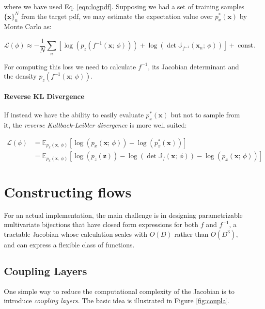 where we have used Eq. \ref{eqn:logpdf}. Supposing we had a set of training samples $\{\mathbf{x}\}^N_n$ from the target pdf, we may estimate the expectation value over $p_x^*(\mathbf{x})$ by Monte Carlo as:

\[
\mathcal{L}(\phi) \approx -\frac{1}{N} \sum_n [\log(p_z(f^{-1}(\mathbf{x}; \, \phi)))+\log\left(\det\mathbb{J}_{f^{-1}}(\mathbf{x}_n; \, \phi)\right)] +\; \text{const.}
\]

For computing this loss we need to calculate $f^{-1}$, its Jacobian determinant and the density $p_z(f^{-1}(\mathbf{x}; \, \phi))$. 

\paragraph{Reverse KL Divergence} If instead we have the ability to easily evaluate $p_x^*(\mathbf{x})$ but not to sample from it, the \emph{reverse Kullback-Leibler divergence} is more well suited:

\[
\begin{aligned}
    \mathcal{L}(\phi) &= \mathbb{E}_{p_x(\mathbf{x}, \, \phi)}[\log(p_x(\mathbf{x}; \, \phi)) - \log(p_x^*(\mathbf{x}))]\\
    &= \mathbb{E}_{p_x(\mathbf{x}, \, \phi)}[\log(p_z(\mathbf{z}))-\log\left(\det\mathbb{J}_{f}(\mathbf{x}; \, \phi)\right)-\log(p_x(\mathbf{x}; \, \phi))]
\end{aligned}
\]

\section{Constructing flows}
For an actual implementation, the main challenge is in designing parametrizable multivariate bijections that have closed form expressions for both $f$ and $f^{-1}$, a tractable Jacobian whose calculation scales with $O(D)$ rather than $O(D^3)$, and can express a flexible class of functions.

\subsection{Coupling Layers}\label{sec:couplay}

One simple way to reduce the computational complexity of the Jacobian is to introduce \emph{coupling layers}. The basic idea is illustrated in Figure \ref{fig:coupla}.

